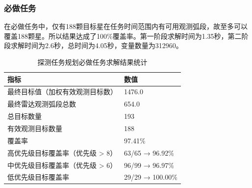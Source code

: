 \documentclass[openany,12pt,UTF8]{ctexart}
\begin{document}
\subsubsection{必做任务}
在必做任务中，仅有188颗目标星在任务时间范围内有可用观测弧段，故至多可以覆盖188颗星。所以结果达成了100\%覆盖率。第一阶段求解时间为1.35秒，第二阶段求解时间为2.6秒，总时间为4.05秒，变量数量为312960。
\begin{table}[h]
    \centering
    \caption{探测任务规划必做任务求解结果统计}
    \label{tab:探测任务规划必做任务求解结果统计}
    \begin{tabularx}{0.8\columnwidth}{Xl}
        \toprule
        \textbf{指标}        & \textbf{数值}      \\
        \midrule
        最终目标值（加权有效观测目标数）   & 1476.0           \\
        最终雷达观测弧段总数         & 654.0            \\
        总目标数量              & 193              \\
        有效观测目标数量           & 188              \\
        覆盖率                & 97.41\%          \\
        高优先级目标覆盖率（优先级 > 8） & 63/65 → 96.92\%  \\
        中优先级目标覆盖率（优先级 > 6） & 96/99 → 96.97\%  \\
        低优先级目标覆盖率          & 29/29 → 100.00\% \\
        \bottomrule
    \end{tabularx}
\end{table}
\end{document}
